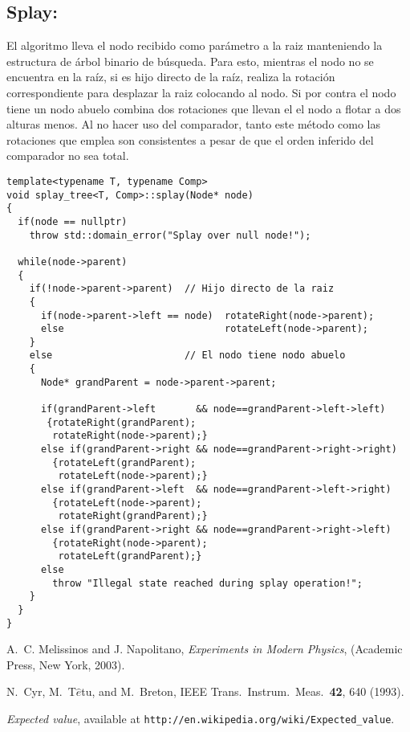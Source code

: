 \documentclass[letterpaper,12pt]{article}
\begin{document}
\subsection{Splay:}

El algoritmo lleva el nodo recibido como parámetro a la raiz manteniendo la
estructura de árbol binario de búsqueda. Para esto, mientras el nodo no se
encuentra en la raíz, si es hijo directo de la raíz, realiza la rotación 
correspondiente para desplazar la raiz colocando al nodo. Si por contra el
nodo tiene un nodo abuelo combina dos rotaciones que llevan el el nodo a 
flotar a dos alturas menos. Al no hacer uso del comparador, tanto este método
como las rotaciones que emplea son consistentes a pesar de que el orden 
inferido del comparador no sea total.


\begin{lstlisting}
template<typename T, typename Comp>
void splay_tree<T, Comp>::splay(Node* node)
{
  if(node == nullptr)
    throw std::domain_error("Splay over null node!");

  while(node->parent)
  {
    if(!node->parent->parent)  // Hijo directo de la raiz
    {
      if(node->parent->left == node)  rotateRight(node->parent);
      else                            rotateLeft(node->parent);
    }
    else                       // El nodo tiene nodo abuelo
    {
      Node* grandParent = node->parent->parent;

      if(grandParent->left       && node==grandParent->left->left)
       {rotateRight(grandParent);
        rotateRight(node->parent);}
      else if(grandParent->right && node==grandParent->right->right)
        {rotateLeft(grandParent);
         rotateLeft(node->parent);}
      else if(grandParent->left  && node==grandParent->left->right)
        {rotateLeft(node->parent);
         rotateRight(grandParent);}
      else if(grandParent->right && node==grandParent->right->left)
        {rotateRight(node->parent);
         rotateLeft(grandParent);}
      else
        throw "Illegal state reached during splay operation!";
    }
  }
}
\end{lstlisting}



\begin{thebibliography}{99}

A.~C. Melissinos and J. Napolitano, \textit{Experiments in Modern Physics},
(Academic Press, New York, 2003).

N.\ Cyr, M.\ T$\hat{e}$tu, and M.\ Breton,
IEEE Trans.\ Instrum.\ Meas.\ \textbf{42}, 640 (1993).

 \emph{Expected value},  available at
\texttt{http://en.wikipedia.org/wiki/Expected\_value}.

\end{thebibliography}
\end{document}
